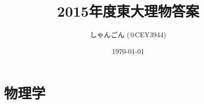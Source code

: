 \documentclass[11pt,dvipdfmx,a4paper]{jsreport}
\title{2015年度東大理物答案}
\author{しゃんごん (@CEY3944)}
\date{\today}
\numberwithin{equation}{subsection} %
\begin{document}

\maketitle

\clearpage
\chapter*{物理学}

\clearpage

\clearpage

\clearpage

\clearpage

\clearpage

\end{document}
